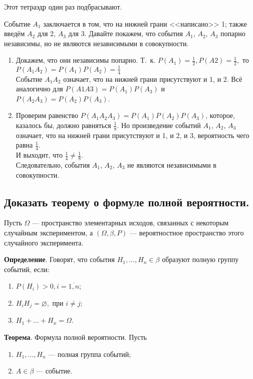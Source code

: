 Этот тетраэдр один раз подбрасывают.

Событие $A_1$ заключается в том, что на нижней грани <<написано>> 1; также введём $A_2$ для 2, $A_3$ для 3. Давайте покажем, что события $A_1$, $A_2$, $A_3$ попарно независимы, но не являются независимыми в совокупности.

\begin{enumerate}
	\item Докажем, что они независимы попарно. Т.~к. $P(A_1) = \frac{1}{2}, P(A2) = \frac{1}{2}, $ то $P(A_1A_2) = P(A_1)P(A_2) = \frac{1}{4}$\\
	Событие $A_1A_2$ означает, что на нижней грани присутствуют и 1, и 2. Всё аналогично для $P(A1A3) = P(A_1)P(A_3)$ и $P(A_2A_3) = P(A_2)P(A_3)$.
	\item Проверим равенство $P(A_1A_2A_3) = P(A_1)P(A_2)P(A_3)$, которое, казалось бы, должно равняться $\frac{1}{8}$. Но произведение событий $A_1$, $A_2$, $A_3$ означает, что на
	нижней грани присутствуют и 1, и 2, и 3, вероятность чего равна $\frac{1}{4}$.\\
	И выходит, что $\frac{1}{4} \neq \frac{1}{8}$.\\
	Следовательно, события $A_1$, $A_2$, $A_3$ не являются независимыми в совокупности.
\end{enumerate}

\subsection{Доказать теорему о формуле полной вероятности.}

Пусть $\Omega$ — пространство элементарных исходов, связанных с некоторым случайным экспериментом, а $(\Omega, \beta, P)$ --- вероятностное пространство этого случайного эксперимента.

\textbf{Определение}. Говорят, что события $H_{1}, ..., H_{n} \in \beta$ образуют полную группу событий, если:
\begin{enumerate}
	\item $P(H_{i}) > 0, i = \overline{1, n}$;
	\item $H_{i} H_{j} = \varnothing, \text{ при } i \neq j$;
	\item $H_{1} + ... + H_{n} = \Omega$.
\end{enumerate}

\textbf{Теорема}. Формула полной вероятности. Пусть
\begin{enumerate}
	\item $H_{1}, ..., H_{n}$ --- полная группа событий;
	\item $A \in \beta$ --- событие.
\end{enumerate}

